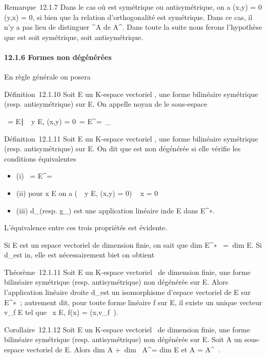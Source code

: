 \documentclass[]{article}
\begin{document}
Remarque~12.1.7 Dans le cas où \phi est symétrique ou antisymétrique, on a
\phi(x,y) = 0 \Leftrightarrow \phi(y,x) = 0, si bien que la
relation d'orthogonalité est symétrique. Dans ce cas, il n'y a pas lieu
de distinguer ^\bot A de A^\bot. Dans toute la suite
nous ferons l'hypothèse que \phi est soit symétrique, soit antisymétrique.

\paragraph{12.1.6 Formes non dégénérées}

En règle générale on posera

Définition~12.1.10 Soit E un K-espace vectoriel , \phi une forme bilinéaire
symétrique (resp. antisymétrique) sur E. On appelle noyau de \phi le
sous-espace

\mathrmKer~\phi =
\x \in
E∣\forall~~y \in E, \phi(x,y) =
0\ = E^\bot =\
\mathrmKerd\_ \phi

Définition~12.1.11 Soit E un K-espace vectoriel , \phi une forme bilinéaire
symétrique (resp. antisymétrique) sur E. On dit que \phi est non dégénérée
si elle vérifie les conditions équivalentes

\begin{itemize}
\itemsep1pt\parskip0pt
\item
  (i) \mathrmKer~\phi =
  E^\bot = \0\
\item
  (ii) pour x \in E on a \left
  (\forall~~y \in E, \phi(x,y) = 0\right ) \rigtharrow~
  x = 0
\item
  (iii) d\_\phi (resp. g\_\phi) est une application linéaire
  in\jmathective de E dans E^∗.
\end{itemize}

L'équivalence entre ces trois propriétés est évidente.

Si E est un espace vectoriel de dimension finie, on sait que
dim E^∗~ =\
dim E. Si d\_\phi est in\jmathective, elle est nécessairement
bi\jmathective et on obtient

Théorème~12.1.11 Soit E un K-espace vectoriel ~de dimension finie, \phi une
forme bilinéaire symétrique (resp. antisymétrique) non dégénérée sur E.
Alors l'application linéaire droite d\_\phi est un isomorphisme
d'espace vectoriel de E sur E^∗~; autrement dit, pour toute
forme linéaire f sur E, il existe un unique vecteur v\_f \in E tel
que \forall~x \in E, f(x) = \phi(x,v\_f~).

Corollaire~12.1.12 Soit E un K-espace vectoriel ~de dimension finie, \phi
une forme bilinéaire symétrique (resp. antisymétrique) non dégénérée sur
E. Soit A un sous-espace vectoriel de E. Alors
dim A +\ dim~
A^\bot = dim E et A = A^\bot\bot~.
\end{document}
